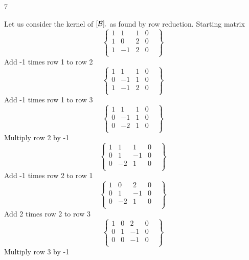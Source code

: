 \documentclass{exercises}
\begin{document}
\begin{exr}{}{7}
\begin{enumerate}
		Let us consider the kernel of $[\scriptb]_\cdot$ as found by row reduction.
Starting matrix
\begin{equation}
\left\{
    \begin{array}{ccc|cl}1&1&1&0&\\1&0&2&0&\\1&-1&2&0&\\\end{array}
\right\}
\end{equation}Add -1 times row 1 to row 2
\begin{equation}
\left\{
    \begin{array}{ccc|cl}1&1&1&0&\\0&-1&1&0&\\1&-1&2&0&\\\end{array}
\right\}
\end{equation}Add -1 times row 1 to row 3
\begin{equation}
\left\{
    \begin{array}{ccc|cl}1&1&1&0&\\0&-1&1&0&\\0&-2&1&0&\\\end{array}
\right\}
\end{equation}Multiply row 2 by -1
\begin{equation}
\left\{
    \begin{array}{ccc|cl}1&1&1&0&\\0&1&-1&0&\\0&-2&1&0&\\\end{array}
\right\}
\end{equation}Add -1 times row 2 to row 1
\begin{equation}
\left\{
    \begin{array}{ccc|cl}1&0&2&0&\\0&1&-1&0&\\0&-2&1&0&\\\end{array}
\right\}
\end{equation}Add 2 times row 2 to row 3
\begin{equation}
\left\{
    \begin{array}{ccc|cl}1&0&2&0&\\0&1&-1&0&\\0&0&-1&0&\\\end{array}
\right\}
\end{equation}Multiply row 3 by -1

\end{enumerate}
\end{exr}
\end{document}
